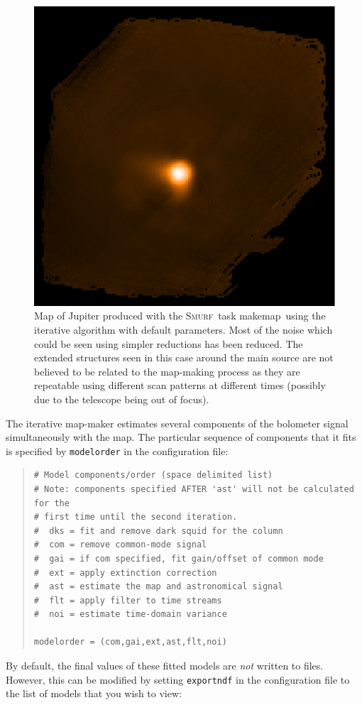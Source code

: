 \documentclass[twoside,11pt]{article}
\newenvironment{myquote}{\begin{quote}\begin{small}}{\end{small}\end{quote}}
\newcommand{\smurf}{\xref{\textsc{Smurf}}{sun258}{}}
\newcommand{\task}[1]{\textsf{#1}}
\newcommand{\makemap}{\xref{\task{makemap}}{sun258}{MAKEMAP}}
\newcommand{\xref}[3]{#1}
\renewcommand{\_}{\texttt{\symbol{95}}}
\begin{document}
\begin{figure}
\begin{center}
\includegraphics[width=0.5\linewidth]{map_iterate}
\caption{Map of Jupiter produced with the \smurf\ task \makemap\ using
  the iterative algorithm with default parameters. Most of the noise
  which could be seen using simpler reductions has been reduced. The
  extended structures seen in this case around the main source are not
  believed to be related to the map-making process as they are
  repeatable using different scan patterns at different times
  (possibly due to the telescope being out of focus).}
\label{fig:itermap}
\end{center}
\end{figure}

The iterative map-maker estimates several components of the bolometer
signal simultaneously with the map. The particular sequence of
components that it fits is specified by \texttt{modelorder} in the
configuration file:

\begin{myquote}
\begin{verbatim}
# Model components/order (space delimited list)
# Note: components specified AFTER 'ast' will not be calculated for the
# first time until the second iteration.
#  dks = fit and remove dark squid for the column
#  com = remove common-mode signal
#  gai = if com specified, fit gain/offset of common mode
#  ext = apply extinction correction
#  ast = estimate the map and astronomical signal
#  flt = apply filter to time streams
#  noi = estimate time-domain variance

modelorder = (com,gai,ext,ast,flt,noi)
\end{verbatim}
\end{myquote}

By default, the final values of these fitted models are {\em not}
written to files. However, this can be modified by setting
\texttt{exportndf} in the configuration file to the list of models
that you wish to view:
\end{document}
